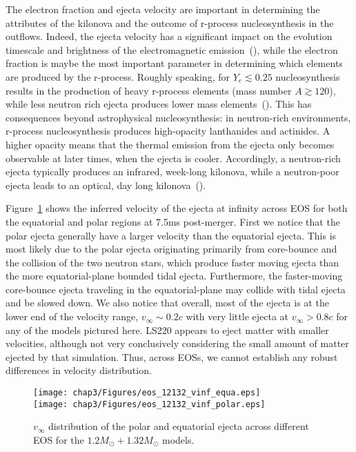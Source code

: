 The electron fraction and ejecta velocity are important in determining the attributes of the kilonova and the outcome of r-process nucleosynthesis in the outflows. Indeed, the ejecta velocity has a significant impact on the evolution timescale and brightness of the electromagnetic emission~(\citet*{2013apj...775...18b}), while the electron fraction is maybe the most important parameter in determining which elements are produced by the r-process. Roughly speaking, for $Y_e\lesssim 0.25$ nucleosynthesis results in the production of heavy r-process elements (mass number $A\gtrsim 120$), while less neutron rich ejecta produces lower mass elements~(\citet*{lippuner2015}). This has consequences beyond astrophysical nucleosynthesis: in neutron-rich environments, r-process nucleosynthesis produces high-opacity lanthanides and actinides. A higher opacity means that the thermal emission from the ejecta only becomes observable at later times, when the ejecta is cooler. Accordingly, a neutron-rich ejecta typically produces an infrared, week-long kilonova, while a neutron-poor ejecta leads to an optical, day long kilonova~(\citet*{kasen:2013xka,2013apj...775...18b}).

Figure~\ref{fig:vinf_ejecta_tab_eos} shows the inferred velocity of the ejecta at infinity across EOS for both the equatorial and polar regions at 7.5ms post-merger. First we notice that the polar ejecta generally have a larger velocity than the equatorial ejecta. This is most likely due to the polar ejecta originating primarily from core-bounce and the collision of the two neutron stars, which produce faster moving ejecta than the more equatorial-plane bounded tidal ejecta. Furthermore, the faster-moving core-bounce ejecta traveling in the equatorial-plane may collide with tidal ejecta and be slowed down. %
We also notice that overall, most of the ejecta is at the lower end of the velocity range, $v_\infty \sim 0.2c$ with very little ejecta at $v_\infty > 0.8c$ for any of the models pictured here. LS220 appears to eject matter with smaller velocities, although not very conclusively considering the small amount of matter ejected by that simulation.
Thus, across EOSs, we cannot establish any robust differences in velocity distribution.

\begin{figure}[!htbp]
  \centering
  \texttt{[image: chap3/Figures/eos\_12132\_vinf\_equa.eps]}\\
  \texttt{[image: chap3/Figures/eos\_12132\_vinf\_polar.eps]}
\caption{
   $v_\infty$ distribution of the polar and equatorial ejecta across different EOS for the $1.2M_\odot + 1.32M_\odot$ models.
}
\label{fig:vinf_ejecta_tab_eos}
\end{figure}

